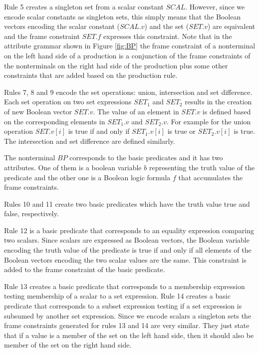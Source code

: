 Rule 5 creates a singleton set from a scalar constant $SCAL$. However,
since we encode scalar constants as singleton sets, this simply means
that the Boolean vectors encoding the scalar constant ($SCAL.v$)
and the set ($SET.v$) are equivalent and the frame constraint
$SET.f$ expresses this constraint.
Note that in the attribute grammar shown in  Figure \ref{fig:BP}
the frame constraint of a nonterminal on the left hand side of a production
is a conjunction of the frame constraints of the nonterminals
on the right had side of the production plus some other constraints
that are added based on the production rule.

Rules 7, 8 and 9 encode the set operations: union, intersection and set
difference. Each set operation on two set expressions $SET_1$ and $SET_2$
results in the creation of new Boolean vector $SET.v$.
The value of an element in $SET.v$ is defined based on the corresponding
elements in  $SET_1.v$ and $SET_2.v$.
For example for the union operation
$SET.v[i]$ is true if and only if $SET_1.v[i]$ is true or $SET_2.v[i]$ is true.
The intersection and set difference are defined similarly.

The nonterminal $BP$ corresponds to the basic predicates and it has
two attributes. One of them is a boolean variable $b$ representing
the truth value of the predicate and the other one is a
Boolean logic formula $f$ that accumulates the frame constraints.

Rules 10 and 11 create two basic predicates which have the 
truth value true and false, respectively.

Rule 12 is a basic predicate that corresponds to an equality expression
comparing two scalars. Since scalars are expressed as Boolean vectors,
the Boolean variable encoding the truth value of the predicate  is
true if and only if all elements of the Boolean vectors encoding the two
scalar values are the same. This constraint is added to the frame constraint
of the basic predicate.

Rule 13 creates a basic predicate that corresponds to a membership
expression testing membership of a scalar to a set expression.
Rule 14 creates a basic predicate that corresponds to a subset
expression testing if a set expression is subsumed by another set expression.
Since we encode scalars a singleton sets the frame constraints  generated
for rules 13 and 14 are very similar. They just state that if a value
is a member of the set on the left hand side, then it should also be member of
the set on the right hand side.

